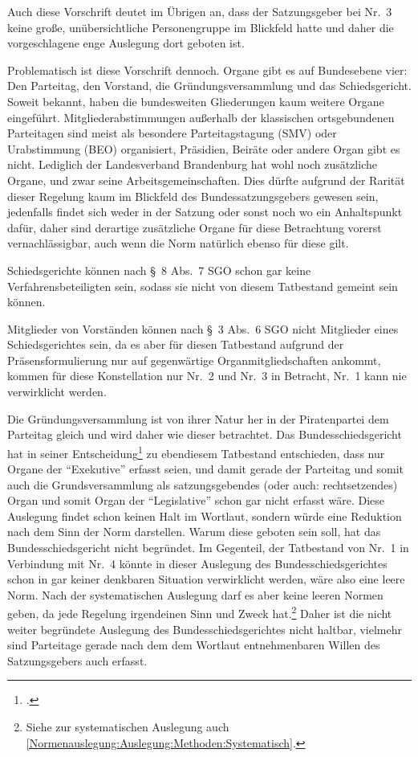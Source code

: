 Auch diese Vorschrift deutet im Übrigen an, dass der Satzungsgeber bei Nr.~3 keine große, unübersichtliche Personengruppe im Blickfeld hatte und daher die vorgeschlagene enge Auslegung dort geboten ist.

Problematisch ist diese Vorschrift dennoch.
Organe gibt es auf Bundesebene vier: Den Parteitag, den Vorstand, die Gründungsversammlung und das Schiedsgericht.
Soweit bekannt, haben die bundesweiten Gliederungen kaum weitere Organe eingeführt.
Mitgliederabstimmungen außerhalb der klassischen ortsgebundenen Parteitagen sind meist als besondere Parteitagstagung (SMV) oder Urabstimmung (BEO) organisiert, Präsidien, Beiräte oder andere Organ gibt es nicht.
Lediglich der Landesverband Brandenburg hat wohl noch zusätzliche Organe, und zwar seine Arbeitsgemeinschaften.
Dies dürfte aufgrund der Rarität dieser Regelung kaum im Blickfeld des Bundessatzungsgebers gewesen sein, jedenfalls findet sich weder in der Satzung oder sonst noch wo ein Anhaltspunkt dafür, daher sind derartige zusätzliche Organe für diese Betrachtung vorerst vernachlässigbar, auch wenn die Norm natürlich ebenso für diese gilt.

Schiedsgerichte können nach \S~8 Abs.~7 SGO schon gar keine Verfahrensbeteiligten sein, sodass sie nicht von diesem Tatbestand gemeint sein können.

Mitglieder von Vorständen können nach \S~3 Abs.~6 SGO nicht Mitglieder eines Schiedsgerichtes sein, da es aber für diesen Tatbestand aufgrund der Präsensformulierung nur auf gegenwärtige Organmitgliedschaften ankommt, kommen für diese Konstellation nur Nr.~2 und Nr.~3 in Betracht, Nr.~1 kann nie verwirklicht werden.

Die Gründungsversammlung ist von ihrer Natur her in der Piratenpartei dem Parteitag gleich und wird daher wie dieser betrachtet. Das Bundesschiedsgericht hat in seiner Entscheidung\footnote{\cite{BSGPP100127862}.} zu ebendiesem Tatbestand entschieden, dass nur Organe der \enquote{Exekutive} erfasst seien, und damit gerade der Parteitag und somit auch die Grundsversammlung als satzungsgebendes (oder auch: rechtsetzendes) Organ und somit Organ der \enquote{Legislative} schon gar nicht erfasst wäre.
Diese Auslegung findet schon keinen Halt im Wortlaut, sondern würde eine Reduktion nach dem Sinn der Norm darstellen.
Warum diese geboten sein soll, hat das Bundesschiedsgericht nicht begründet.
Im Gegenteil, der Tatbestand von Nr.~1 in Verbindung mit Nr.~4 könnte in dieser Auslegung des Bundesschiedsgerichtes schon in gar keiner denkbaren Situation verwirklicht werden, wäre also eine leere Norm.
Nach der systematischen Auslegung darf es aber keine leeren Normen geben, da jede Regelung irgendeinen Sinn und Zweck hat.\footnote{Siehe zur systematischen Auslegung auch \ref{Normenauslegung:Auslegung:Methoden:Systematisch}.}
Daher ist die nicht weiter begründete Auslegung des Bundesschiedsgerichtes nicht haltbar, vielmehr sind Parteitage gerade nach dem dem Wortlaut entnehmenbaren Willen des Satzungsgebers auch erfasst.

